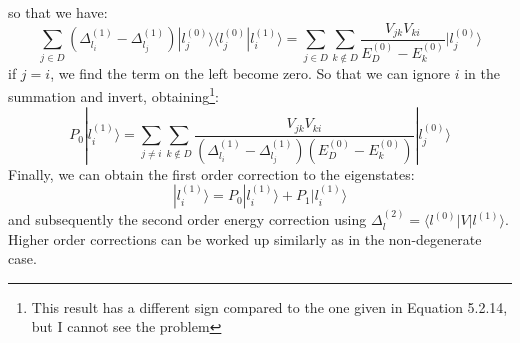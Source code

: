 \documentclass{article}
\newcommand{\order}[2]{#1^{(#2)}}
\newcommand{\statebra}[1]{\langle #1 |}
\newcommand{\stateket}[1]{| #1 \rangle}
\begin{document}
so that we have:
\begin{equation}
    \sum_{j\in D} (\order{\Delta_{l_i}}{1} - \order{\Delta_{l_j}}{1}) \stateket{ \order{l_j}{0} } \statebra{\order{l_j}{0}} \order{l_i}{1} \rangle
    = \sum_{j\in D} \sum_{k\notin D} \frac{V_{jk}V_{ki}}{\order{E_D}{0} - \order{E_k}{0}} \stateket{ \order{l_j}{0} }
\end{equation}
if $j = i$, we find the term on the left become zero. So that we can ignore $i$ in the summation and 
invert, obtaining\footnote{This result has a different sign compared to the one given in Equation 5.2.14, but I cannot see the problem}:
\begin{equation}
    P_0 \stateket{ \order{l_i}{1}} = \sum_{j\neq i} \sum_{k\notin D} \frac{V_{jk}V_{ki}}{(\order{\Delta_{l_i}}{1} - \order{\Delta_{l_j}}{1})(\order{E_D}{0} - \order{E_k}{0})} \stateket{ \order{l_j}{0} }
\end{equation}
Finally, we can obtain the first order correction to the eigenstates:
\begin{equation}
    \stateket{\order{l_i}{1}} = P_0 \stateket{\order{l_i}{1}} + P_1 \stateket{\order{l_i}{1}}
\end{equation}
and subsequently the second order energy correction using 
$\order{\Delta_l}{2} = \statebra{\order{l}{0}} V \stateket{\order{l}{1}}$. Higher order corrections 
can be worked up similarly as in the non-degenerate case. 
\end{document}

